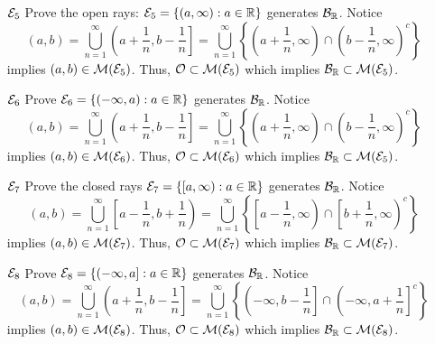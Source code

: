 \begin{enumerate}
\begin{pf}
\begin{enumerate}
\item[${\mathcal E}_5$] Prove the open rays: ${\mathcal E}_5 = \{ (a,\infty) : a \in {\mathbb R}\}$ generates ${\mathcal B}_{\mathbb R}$. Notice 
\[ (a,b)=\bigcup_{n=1}^\infty \left(a + \frac{1}{n}, b-\frac{1}{n} \right]= \bigcup_{n=1}^\infty \left\lbrace \left(a+\frac{1}{n}, \infty \right) \cap \left(b - \frac{1}{n}, \infty \right)^c \right\rbrace 
\]
implies $(a,b) \in {\mathcal M}({\mathcal E}_5)$. Thus, ${\mathcal O} \subset {\mathcal M}({\mathcal E}_5)$ which implies ${\mathcal B}_{\mathbb R} \subset {\mathcal M}({\mathcal E}_5)$. 
\item[${\mathcal E}_6$] Prove ${\mathcal E}_6 = \{ (-\infty, a) : a \in {\mathbb R}\}$ generates ${\mathcal B}_{\mathbb R}$. Notice 
\[ (a,b)=\bigcup_{n=1}^\infty \left(a + \frac{1}{n}, b-\frac{1}{n} \right]= \bigcup_{n=1}^\infty \left\lbrace \left(a+\frac{1}{n}, \infty \right) \cap \left(b - \frac{1}{n}, \infty \right)^c \right\rbrace 
\]
implies $(a,b) \in {\mathcal M}({\mathcal E}_6)$. Thus, ${\mathcal O} \subset {\mathcal M}({\mathcal E}_6)$ which implies ${\mathcal B}_{\mathbb R} \subset {\mathcal M}({\mathcal E}_5)$. 
\item[${\mathcal E}_7$] Prove the closed rays ${\mathcal E}_7 = \{ [a,\infty) : a \in {\mathbb R}\}$ generates ${\mathcal B}_{\mathbb R}$. Notice 
\[ (a,b)=\bigcup_{n=1}^\infty \left[a - \frac{1}{n}, b+\frac{1}{n} \right)= \bigcup_{n=1}^\infty \left\lbrace \left[a-\frac{1}{n}, \infty \right) \cap \left[b + \frac{1}{n}, \infty \right)^c \right\rbrace 
\]
implies $(a,b) \in {\mathcal M}({\mathcal E}_7)$. Thus, ${\mathcal O} \subset {\mathcal M}({\mathcal E}_7)$ which implies ${\mathcal B}_{\mathbb R} \subset {\mathcal M}({\mathcal E}_7)$. 
\item[${\mathcal E}_8$] Prove ${\mathcal E}_8 = \{ (-\infty, a] : a \in {\mathbb R}\}$ generates ${\mathcal B}_{\mathbb R}$. Notice 
\[ (a,b)=\bigcup_{n=1}^\infty \left(a + \frac{1}{n}, b-\frac{1}{n} \right]= \bigcup_{n=1}^\infty \left\lbrace \left(-\infty , b-\frac{1}{n} \right] \cap \left(-\infty, a + \frac{1}{n}\right]^c \right\rbrace 
\]
implies $(a,b) \in {\mathcal M}({\mathcal E}_8)$. Thus, ${\mathcal O} \subset {\mathcal M}({\mathcal E}_8)$ which implies ${\mathcal B}_{\mathbb R} \subset {\mathcal M}({\mathcal E}_8)$. 
\end{enumerate}
\end{pf}
\end{enumerate}




